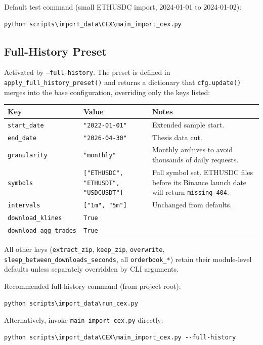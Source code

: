 \documentclass[11pt,a4paper]{article}
\begin{document}
Default test command (small ETHUSDC import, 2024-01-01 to 2024-01-02):
\begin{lstlisting}
python scripts\import_data\CEX\main_import_cex.py
\end{lstlisting}

\subsection{Full-History Preset}

Activated by \texttt{--full-history}. The preset is defined in
\texttt{apply\_full\_history\_preset()} and returns a dictionary that
\texttt{cfg.update()} merges into the base configuration, overriding
only the keys listed:

\begin{xltabular}{\linewidth}{L{3.8cm}L{3.0cm}Y}
\toprule
\textbf{Key} & \textbf{Value} & \textbf{Notes} \\
\midrule
\texttt{start\_date} & \texttt{"2022-01-01"} &
  Extended sample start. \\
\texttt{end\_date} & \texttt{"2026-04-30"} &
  Thesis data cut. \\
\texttt{granularity} & \texttt{"monthly"} &
  Monthly archives to avoid thousands of daily requests. \\
\texttt{symbols} & \texttt{["ETHUSDC", "ETHUSDT", "USDCUSDT"]} &
  Full symbol set. ETHUSDC files before its Binance launch date
  will return \texttt{missing\_404}. \\
\texttt{intervals} & \texttt{["1m", "5m"]} &
  Unchanged from defaults. \\
\texttt{download\_klines} & \texttt{True} & \\
\texttt{download\_agg\_trades} & \texttt{True} & \\
\bottomrule
\end{xltabular}

All other keys (\texttt{extract\_zip}, \texttt{keep\_zip},
\texttt{overwrite}, \texttt{sleep\_between\_downloads\_seconds},
all \texttt{orderbook\_*}) retain their module-level defaults unless
separately overridden by CLI arguments.

Recommended full-history command (from project root):
\begin{lstlisting}
python scripts\import_data\run_cex.py
\end{lstlisting}
Alternatively, invoke \texttt{main\_import\_cex.py} directly:
\begin{lstlisting}
python scripts\import_data\CEX\main_import_cex.py --full-history
\end{lstlisting}
\end{document}
